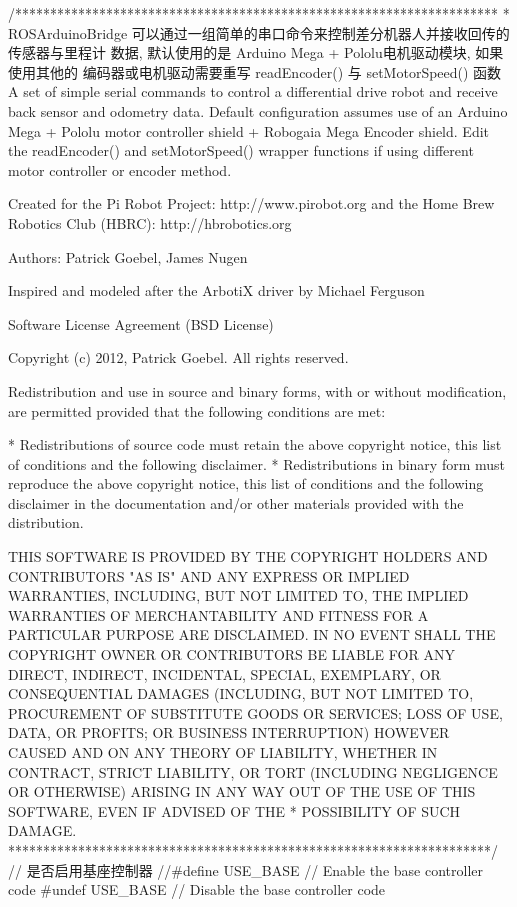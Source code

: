 \documentclass[openany, fontset=windowsold]{ctexbook}
\theoremstyle{kaiti}
\theoremstyle{normal}
\begin{document}
\begin{cpp}
  /*********************************************************************
  *  ROSArduinoBridge
      可以通过一组简单的串口命令来控制差分机器人并接收回传的传感器与里程计
      数据, 默认使用的是 Arduino Mega + Pololu电机驱动模块, 如果使用其他的
      编码器或电机驱动需要重写 readEncoder() 与 setMotorSpeed() 函数
      A set of simple serial commands to control a differential drive
      robot and receive back sensor and odometry data. Default 
      configuration assumes use of an Arduino Mega + Pololu motor
      controller shield + Robogaia Mega Encoder shield.  Edit the
      readEncoder() and setMotorSpeed() wrapper functions if using 
      different motor controller or encoder method.

      Created for the Pi Robot Project: http://www.pirobot.org
      and the Home Brew Robotics Club (HBRC): http://hbrobotics.org

      Authors: Patrick Goebel, James Nugen

      Inspired and modeled after the ArbotiX driver by Michael Ferguson

      Software License Agreement (BSD License)

      Copyright (c) 2012, Patrick Goebel.
      All rights reserved.

      Redistribution and use in source and binary forms, with or without
      modification, are permitted provided that the following conditions
      are met:

      * Redistributions of source code must retain the above copyright
        notice, this list of conditions and the following disclaimer.
      * Redistributions in binary form must reproduce the above
        copyright notice, this list of conditions and the following
        disclaimer in the documentation and/or other materials provided
        with the distribution.

      THIS SOFTWARE IS PROVIDED BY THE COPYRIGHT HOLDERS AND CONTRIBUTORS
      "AS IS" AND ANY EXPRESS OR IMPLIED WARRANTIES, INCLUDING, BUT NOT
      LIMITED TO, THE IMPLIED WARRANTIES OF MERCHANTABILITY AND FITNESS
      FOR A PARTICULAR PURPOSE ARE DISCLAIMED. IN NO EVENT SHALL THE
      COPYRIGHT OWNER OR CONTRIBUTORS BE LIABLE FOR ANY DIRECT, INDIRECT,
      INCIDENTAL, SPECIAL, EXEMPLARY, OR CONSEQUENTIAL DAMAGES (INCLUDING,
      BUT NOT LIMITED TO, PROCUREMENT OF SUBSTITUTE GOODS OR SERVICES;
      LOSS OF USE, DATA, OR PROFITS; OR BUSINESS INTERRUPTION) HOWEVER
      CAUSED AND ON ANY THEORY OF LIABILITY, WHETHER IN CONTRACT, STRICT
      LIABILITY, OR TORT (INCLUDING NEGLIGENCE OR OTHERWISE) ARISING IN
      ANY WAY OUT OF THE USE OF THIS SOFTWARE, EVEN IF ADVISED OF THE
  *  POSSIBILITY OF SUCH DAMAGE.
  *********************************************************************/
  // 是否启用基座控制器
  //#define USE_BASE      // Enable the base controller code
  #undef USE_BASE     // Disable the base controller code


\end{cpp}
\end{document}
